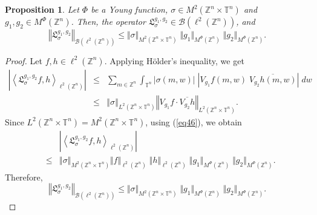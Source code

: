 \documentclass[a4paper,11pt, reqno]{amsart}
\theoremstyle{plain}
\newtheorem{proposition}[theorem]{Proposition}
\theoremstyle{definition}
\theoremstyle{remark}
\def \Z{{\mathbb Z}}
\def \T{{\mathbb T}}
\begin{document}
\begin{proposition}\label{pro2}
Let $\Phi$ be a Young function, $\sigma \in M^2(\Z^n \times \T^n)$ and $g_1, g_2 \in  M^{\Phi}(\Z^n)$. Then, the operator $\mathfrak{L}^{g_1, g_2}_{\sigma} \in \mathcal{B}(\ell^2(\Z^n))$, and 
\[ \left\Vert \mathfrak{L}^{g_1, g_2}_{\sigma} \right\Vert_{\mathcal{B}(\ell^2(\Z^n))} \leq \Vert \sigma \Vert_{M^2(\Z^n \times \T^n)} \; \Vert g_1 \Vert_{M^{\Phi}(\Z^n)} \; \Vert g_2 \Vert_{M^{\Phi}(\Z^n)}. \]
\end{proposition}  
\begin{proof}
Let $f, h \in \ell^2(\Z^n)$. Applying H\"older's inequality, we get
\begin{eqnarray*}
\left| \left\langle \mathfrak{L}^{g_1, g_2}_{\sigma}f, h \right\rangle_{\ell^2(\Z^n)} \right| 
& \leq & \sum_{m \in \Z^n}  \int_{\T^n} |\sigma(m, w)| \; \left|V_{g_1}f(m, w) \; \overline{V_{g_2}h(m, w)} \right| \; dw \\ 
& \leq & \left\Vert \sigma \right\Vert_{L^2(\Z^n \times \T^n)} \left\Vert V_{g_1}f  \cdot \overline{V_{g_2}h} \right\Vert_{L^2(\Z^n \times \T^n)}.
\end{eqnarray*}
Since $L^2(\Z^n \times \T^n)= M^2(\Z^n \times \T^n)$, using (\ref{eq46}), we obtain
\begin{eqnarray*}
&& \left| \left\langle \mathfrak{L}^{g_1, g_2}_{\sigma}f, h \right\rangle_{\ell^2(\Z^n)} \right| \\
& \leq & \left\Vert \sigma \right\Vert_{M^2(\Z^n \times \T^n)} \Vert f \Vert_{\ell^2(\Z^n)} \; \Vert h \Vert_{\ell^2(\Z^n)} \; \Vert g_1 \Vert_{M^{\Phi}(\Z^n)} \; \Vert g_2 \Vert_{M^{\Phi}(\Z^n)}.
\end{eqnarray*}
Therefore,
\[ \left\Vert \mathfrak{L}^{g_1, g_2}_{\sigma} \right\Vert_{\mathcal{B}(\ell^2(\Z^n))} \leq \Vert \sigma \Vert_{M^2(\Z^n \times \T^n)} \; \Vert g_1 \Vert_{M^{\Phi}(\Z^n)} \; \Vert g_2 \Vert_{M^{\Phi}(\Z^n)}. \]
\end{proof}
\end{document}
